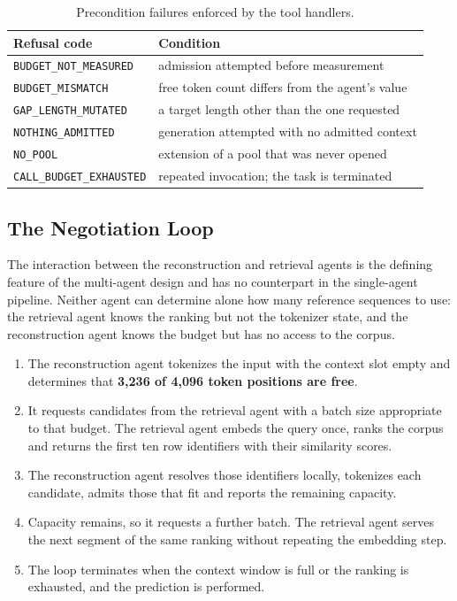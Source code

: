 \begin{table}[H]
\centering
\begin{tabular}{ll}
\toprule
\textbf{Refusal code} & \textbf{Condition} \\
\midrule
\texttt{BUDGET\_NOT\_MEASURED}   & admission attempted before measurement \\
\texttt{BUDGET\_MISMATCH}        & free token count differs from the agent's value \\
\texttt{GAP\_LENGTH\_MUTATED}    & a target length other than the one requested \\
\texttt{NOTHING\_ADMITTED}       & generation attempted with no admitted context \\
\texttt{NO\_POOL}                & extension of a pool that was never opened \\
\texttt{CALL\_BUDGET\_EXHAUSTED} & repeated invocation; the task is terminated \\
\bottomrule
\end{tabular}
\caption{Precondition failures enforced by the tool handlers.}
\label{tab:preconditions}
\end{table}

\subsection{The Negotiation Loop}
\label{subsec:mas-negotiation}

The interaction between the reconstruction and retrieval agents is the defining feature of
the multi-agent design and has no counterpart in the single-agent pipeline. Neither agent can
determine alone how many reference sequences to use: the retrieval agent knows the ranking but
not the tokenizer state, and the reconstruction agent knows the budget but has no access to
the corpus.

\begin{enumerate}
    \item The reconstruction agent tokenizes the input with the context slot empty and
    determines that \textbf{3{,}236 of 4{,}096 token positions are free}.
    \item It requests candidates from the retrieval agent with a batch size appropriate to
    that budget. The retrieval agent embeds the query once, ranks the corpus and returns the
    first ten row identifiers with their similarity scores.
    \item The reconstruction agent resolves those identifiers locally, tokenizes each
    candidate, admits those that fit and reports the remaining capacity.
    \item Capacity remains, so it requests a further batch. The retrieval agent serves the next
    segment of the same ranking without repeating the embedding step.
    \item The loop terminates when the context window is full or the ranking is exhausted, and
    the prediction is performed.
\end{enumerate}

